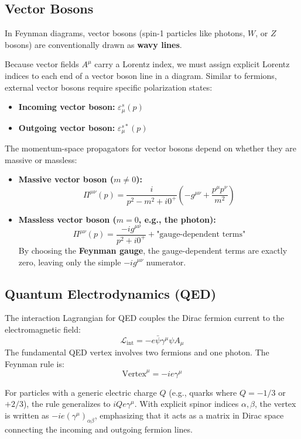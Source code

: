 \subsection{Vector Bosons}

In Feynman diagrams, vector bosons (spin-1 particles like photons, $W$, or $Z$ bosons) are conventionally drawn as \textbf{wavy lines}.

Because vector fields $A^\mu$ carry a Lorentz index, we must assign explicit Lorentz indices to each end of a vector boson line in a diagram. Similar to fermions, external vector bosons require specific polarization states:
\begin{itemize}
    \item \textbf{Incoming vector boson:} $\varepsilon_\mu^s(p)$
    \item \textbf{Outgoing vector boson:} $\varepsilon_\mu^{s *}(p)$
\end{itemize}

The momentum-space propagators for vector bosons depend on whether they are massive or massless:
\begin{itemize}
    \item \textbf{Massive vector boson ($m \neq 0$):}
          \[
              \Pi^{\mu\nu}(p) = \frac{i}{p^2 - m^2 + i0^+} \left( -g^{\mu\nu} + \frac{p^\mu p^\nu}{m^2} \right)
          \]
    \item \textbf{Massless vector boson ($m = 0$, e.g., the photon):}
          \[
              \Pi^{\mu\nu}(p) = \frac{-i g^{\mu\nu}}{p^2 + i0^+} + \text{"gauge-dependent terms"}
          \]
          By choosing the \textbf{Feynman gauge}, the gauge-dependent terms are exactly zero, leaving only the simple $-ig^{\mu\nu}$ numerator.
\end{itemize}


\subsection{Quantum Electrodynamics (QED)}

The interaction Lagrangian for QED couples the Dirac fermion current to the electromagnetic field:
\[
    \mathcal{L}_{\text{int}} = -e \bar{\psi} \gamma^\mu \psi A_\mu
\]
The fundamental QED vertex involves two fermions and one photon. The Feynman rule is:
\[
    \text{Vertex}^\mu = -ie \gamma^\mu
\]
\begin{remark}
    For particles with a generic electric charge $Q$ (e.g., quarks where $Q = -1/3$ or $+2/3$), the rule generalizes to $i Q e \gamma^\mu$. With explicit spinor indices $\alpha, \beta$, the vertex is written as $-ie (\gamma^\mu)_{\alpha\beta}$, emphasizing that it acts as a matrix in Dirac space connecting the incoming and outgoing fermion lines.
\end{remark}


